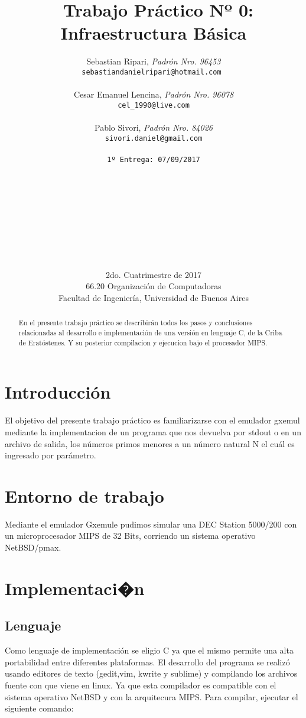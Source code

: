 \documentclass[a4paper,10pt]{article}
\title{	\ Trabajo Práctico Nº 0: Infraestructura Básica}
\author{	Sebastian Ripari, \textit{Padrón Nro. 96453}\\
            \texttt{sebastiandanielripari@hotmail.com }\\\\
            Cesar Emanuel Lencina, \textit{Padrón Nro. 96078}\\
            \texttt{cel_1990@live.com}\\\\
			Pablo Sivori, \textit{Padrón Nro. 84026}\\
            \texttt{sivori.daniel@gmail.com}\\\\               
            \texttt{\footnotesize 1º Entrega: 07/09/2017}\\
            \\\\\\\\\\\\\\\\\\
            \normalsize{2do. Cuatrimestre de 2017}\\ 
            \normalsize{66.20 Organización de Computadoras} \\
            \normalsize{Facultad de Ingeniería, Universidad de Buenos Aires} \\}
\date{}
\begin{document}
\maketitle
\thispagestyle{empty}
\begin{abstract}
En el presente trabajo práctico se describirán todos los pasos y 
conclusiones relacionadas al desarrollo e implementación de una versión en lenguaje C,
de la Criba de Eratóstenes. Y su posterior compilacion y ejecucion bajo el procesador MIPS.
\end{abstract}
\newpage{}
\tableofcontents
\newpage{}

\begin{flushleft}

\par\end{flushleft}
\section{{\normalsize Introducción}}

El objetivo del presente trabajo práctico es familiarizarse con el emulador gxemul mediante la implementacion de un programa que nos devuelva por stdout o en un archivo de salida, los números primos menores a un número natural N el cuál es ingresado por parámetro.

\section{{\normalsize Entorno de trabajo}}
Mediante el emulador Gxemule pudimos simular una DEC Station 5000/200 con un microprocesador MIPS de 32 Bits, corriendo un sistema 
operativo NetBSD/pmax.

\section{{\normalsize Implementaci�n}}



\subsection{{\normalsize Lenguaje}}

Como lenguaje de implementación se eligio C ya que el mismo permite una alta portabilidad entre 
diferentes plataformas. El desarrollo del programa se realizó usando editores de texto 
(gedit,vim, kwrite y sublime) y compilando los archivos fuente con 
 que viene en linux. Ya que esta compilador es compatible
con el sistema operativo NetBSD y con la arquitecura MIPS.
Para compilar, ejecutar el siguiente comando:
\end{document}
